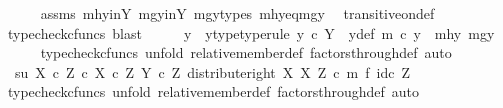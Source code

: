 \begin{isabellebody}
\ \ \ \ \isamarkupfalse%
\ assms\ mhy{\isacharunderscore}{\kern0pt}in{\isacharunderscore}{\kern0pt}Y\ mgy{\isacharunderscore}{\kern0pt}in{\isacharunderscore}{\kern0pt}Y\ mgy{\isacharunderscore}{\kern0pt}types\ mhy{}{\isacharunderscore}{\kern0pt}eq{\isacharunderscore}{\kern0pt}mgy{}\ \isamarkupfalse%
\ transitive{\isacharunderscore}{\kern0pt}on{\isacharunderscore}{\kern0pt}def\isanewline
\ \ \ \ \isamarkupfalse%
\ {\isacharparenleft}{\kern0pt}typecheck{\isacharunderscore}{\kern0pt}cfuncs{\isacharcomma}{\kern0pt}\ blast{\isacharparenright}{\kern0pt}\isanewline
\ \ \isamarkupfalse%
\ \isamarkupfalse%
\ y\ \ y{\isacharunderscore}{\kern0pt}type{\isacharbrackleft}{\kern0pt}type{\isacharunderscore}{\kern0pt}rule{\isacharbrackright}{\kern0pt}{\isacharcolon}{\kern0pt}\ {\isachardoublequoteopen}y\ {\isasymin}\isactrlsub c\ Y{\isachardoublequoteclose}\ \ y{\isacharunderscore}{\kern0pt}def{\isacharcolon}{\kern0pt}\ {\isachardoublequoteopen}m\ {\isasymcirc}\isactrlsub c\ y\ {\isacharequal}{\kern0pt}\ {\isasymlangle}mhy{}{\isacharcomma}{\kern0pt}\ mgy{}{\isasymrangle}{\isachardoublequoteclose}\isanewline
\ \ \ \ \isamarkupfalse%
\ {\isacharparenleft}{\kern0pt}typecheck{\isacharunderscore}{\kern0pt}cfuncs{\isacharcomma}{\kern0pt}\ unfold\ relative{\isacharunderscore}{\kern0pt}member{\isacharunderscore}{\kern0pt}def{}\ factors{\isacharunderscore}{\kern0pt}through{\isacharunderscore}{\kern0pt}def{}{\isacharcomma}{\kern0pt}\ auto{\isacharparenright}{\kern0pt}\isanewline
\isanewline
\ \ \isamarkupfalse%
\ {\isachardoublequoteopen}\ {\isasymlangle}s{\isacharcomma}{\kern0pt}u{\isasymrangle}\ {\isasymin}\isactrlbsub {\isacharparenleft}{\kern0pt}X\ {\isasymtimes}\isactrlsub c\ Z{\isacharparenright}{\kern0pt}\ {\isasymtimes}\isactrlsub c\ X\ {\isasymtimes}\isactrlsub c\ Z\isactrlesub \ {\isacharparenleft}{\kern0pt}Y\ {\isasymtimes}\isactrlsub c\ Z{\isacharcomma}{\kern0pt}\ distribute{\isacharunderscore}{\kern0pt}right\ X\ X\ Z\ {\isasymcirc}\isactrlsub c\ {\isacharparenleft}{\kern0pt}m\ {\isasymtimes}\isactrlsub f\ id\isactrlsub c\ Z{\isacharparenright}{\kern0pt}{\isacharparenright}{\kern0pt}{\isachardoublequoteclose}\ \isanewline
\ \ \isamarkupfalse%
\ {\isacharparenleft}{\kern0pt}typecheck{\isacharunderscore}{\kern0pt}cfuncs{\isacharcomma}{\kern0pt}\ unfold\ relative{\isacharunderscore}{\kern0pt}member{\isacharunderscore}{\kern0pt}def{}\ factors{\isacharunderscore}{\kern0pt}through{\isacharunderscore}{\kern0pt}def{}{\isacharcomma}{\kern0pt}\ auto{\isacharparenright}{\kern0pt}\isanewline

\end{isabellebody}
